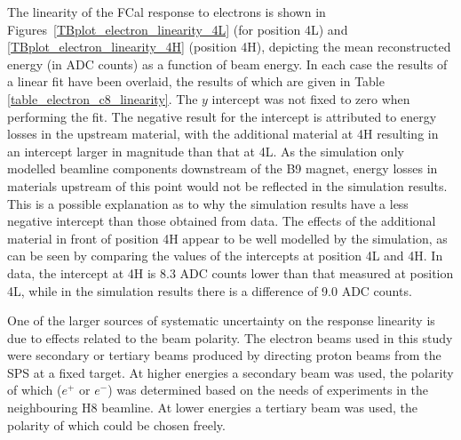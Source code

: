 The linearity of the FCal response to electrons is shown in Figures~\ref{TBplot_electron_linearity_4L} (for position 4L) and \ref{TBplot_electron_linearity_4H} (position 4H), depicting the mean reconstructed energy (in ADC counts) as a function of beam energy. In each case the results of a linear fit have been overlaid, the results of which are given in Table \ref{table_electron_c8_linearity}. The $y$ intercept was not fixed to zero when performing the fit. The negative result for the intercept is attributed to energy losses in the upstream material, with the additional material at 4H resulting in an intercept larger in magnitude than that at 4L. As the simulation only modelled beamline components downstream of the B9 magnet, energy losses in materials upstream of this point would not be reflected in the simulation results. This is a possible explanation as to why the simulation results have a less negative intercept than those obtained from data. The effects of the additional material in front of position 4H appear to be well modelled by the simulation, as can be seen by comparing the values of the intercepts at position 4L and 4H. In data, the intercept at 4H is 8.3 ADC counts lower than that measured at position 4L, while in the simulation results there is a difference of 9.0 ADC counts.  


One of the larger sources of systematic uncertainty on the response linearity is due to effects related to the beam polarity. The electron beams used in this study were secondary or tertiary beams produced by directing proton beams from the SPS at a fixed target. At higher energies a secondary beam was used, the polarity of which ($e^+$ or $e^-$) was determined based on the needs of experiments in the neighbouring H8 beamline. At lower energies a tertiary beam was used, the polarity of which could be chosen freely. %

